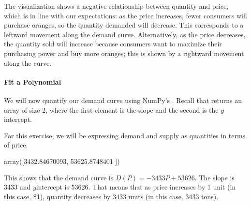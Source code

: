\documentclass[letterpaper,10pt,english]{jupyterBook}
\begin{document}
\noindent{}

\sphinxAtStartPar
The visualization shows a negative relationship between quantity and price, which is in line with our expectations: as the price increases, fewer consumers will purchase oranges, so the quantity demanded will decrease. This corresponds to a leftward movement along the demand curve. Alternatively, as the price decreases, the quantity sold will increase because consumers want to maximize their purchasing power and buy more oranges; this is shown by a rightward movement along the curve.


\paragraph{Fit a Polynomial}
\label{\detokenize{content/02-supply/03-market-equilibria:fit-a-polynomial}}
\sphinxAtStartPar
We will now quantify our demand curve using NumPy’s . Recall that  returns an array of size 2, where the first element is the slope and the second is the \(y\)\sphinxhyphen{}intercept.

\sphinxAtStartPar
For this exercise, we will be expressing demand and supply as quantities in terms of price.

\begin{sphinxVerbatim}[commandchars=\\\{\}]
  
\end{sphinxVerbatim}

\begin{sphinxVerbatim}[commandchars=\\\{\}]
array([\PYGZhy{}3432.84670093, 53625.8748401 ])
\end{sphinxVerbatim}

\sphinxAtStartPar
This shows that the demand curve is \(D(P) = -3433 P+ 53626\). The slope is \sphinxhyphen{}3433 and \(y\)\sphinxhyphen{}intercept is 53626. That means that as price increases by 1 unit (in this case, \$1), quantity decreases by 3433 units (in this case, 3433 tons).
\end{document}
